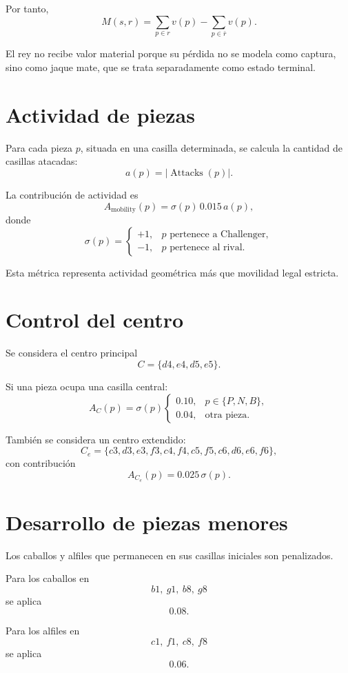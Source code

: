 \documentclass[11pt,a4paper]{article}
\begin{document}
Por tanto,
\[
M(s,r)
=
\sum_{p\in r}v(p)
-
\sum_{p\in\bar r}v(p).
\]

El rey no recibe valor material porque su pérdida no se modela como captura,
sino como jaque mate, que se trata separadamente como estado terminal.

\section{Actividad de piezas}

Para cada pieza $p$, situada en una casilla determinada, se calcula la cantidad
de casillas atacadas:
\[
a(p)=|\operatorname{Attacks}(p)|.
\]

La contribución de actividad es
\[
A_{\mathrm{mobility}}(p)
=
\sigma(p)\,0.015\,a(p),
\]
donde
\[
\sigma(p)=
\begin{cases}
+1, & p \text{ pertenece a Challenger},\\
-1, & p \text{ pertenece al rival}.
\end{cases}
\]

Esta métrica representa actividad geométrica más que movilidad legal estricta.

\section{Control del centro}

Se considera el centro principal
\[
C=\{d4,e4,d5,e5\}.
\]

Si una pieza ocupa una casilla central:
\[
A_C(p)=
\sigma(p)
\begin{cases}
0.10, & p\in\{P,N,B\},\\
0.04, & \text{otra pieza}.
\end{cases}
\]

También se considera un centro extendido:
\[
C_e=
\{c3,d3,e3,f3,c4,f4,c5,f5,c6,d6,e6,f6\},
\]
con contribución
\[
A_{C_e}(p)=0.025\,\sigma(p).
\]

\section{Desarrollo de piezas menores}

Los caballos y alfiles que permanecen en sus casillas iniciales son penalizados.

Para los caballos en
\[
b1,\ g1,\ b8,\ g8
\]
se aplica
\[
0.08.
\]

Para los alfiles en
\[
c1,\ f1,\ c8,\ f8
\]
se aplica
\[
0.06.
\]
\end{document}
